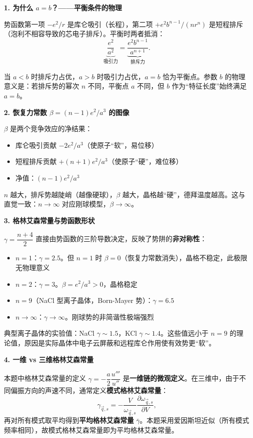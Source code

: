 \begin{insightbox}[物理图像与概念深化]
\textbf{1. 为什么 $a=b$？——平衡条件的物理}

势函数第一项 $-e^2/r$ 是库仑吸引（长程），第二项 $+e^2b^{n-1}/(nr^n)$ 是短程排斥（泡利不相容导致的芯电子排斥）。平衡时两者抵消：
\begin{equation}
\underbrace{\frac{e^2}{a^2}}_{\text{吸引力}}=\underbrace{\frac{e^2b^{n-1}}{a^{n+1}}}_{\text{排斥力}}.
\end{equation}

当 $a<b$ 时排斥力占优，$a>b$ 时吸引力占优，$a=b$ 恰为平衡点。参数 $b$ 的物理意义是：若排斥势的幂次 $n$ 不同，平衡点 $a$ 不同，但 $b$ 作为``特征长度''始终满足 $a=b$。

\textbf{2. 恢复力常数 $\beta=(n-1)e^2/a^3$ 的图像}

$\beta$ 是两个竞争效应的净结果：
\begin{itemize}
    \item 库仑吸引贡献 $-2e^2/a^3$（使原子``软''，易位移）
    \item 短程排斥贡献 $+(n+1)e^2/a^3$（使原子``硬''，难位移）
    \item 净值：$(n-1)e^2/a^3$
\end{itemize}

$n$ 越大，排斥势越陡峭（越像硬球），$\beta$ 越大，晶格越``硬''，德拜温度越高。这与直觉一致：$n\to\infty$ 对应刚球模型，$\beta\to\infty$。

\textbf{3. 格林艾森常量与势函数形状}

$\gamma=\dfrac{n+4}{2}$ 直接由势函数的三阶导数决定，反映了势阱的\textbf{非对称性}：
\begin{itemize}
    \item $n=1$：$\gamma=2.5$。但 $n=1$ 时 $\beta=0$（恢复力常数消失），晶格不稳定，此极限无物理意义
    \item $n=2$：$\gamma=3$。$\beta=e^2/a^3>0$，晶格稳定
    \item $n=9$（NaCl 型离子晶体，Born-Mayer 势）：$\gamma=6.5$
    \item $n\to\infty$：$\gamma\to\infty$。刚球势的非简谐性极端强烈
\end{itemize}

典型离子晶体的实验值：NaCl $\gamma\sim1.5$，KCl $\gamma\sim1.4$。这些值远小于 $n=9$ 的理论值，原因是实际晶体中电子云屏蔽和远程库仑作用使有效势更``软''。

\textbf{4. 一维 vs 三维格林艾森常量}

本题中格林艾森常量的定义 $\gamma=-\dfrac{a}{2}\dfrac{u'''}{u''}$ 是\textbf{一维链的微观定义}。在三维中，由于不同偏振方向的声速不同，通常定义\textbf{模式格林艾森常量}：
\begin{equation}
\gamma_{\vec q,s}=-\frac{V}{\omega_{\vec q,s}}\frac{\partial\omega_{\vec q,s}}{\partial V},
\end{equation}
再对所有模式取平均得到\textbf{平均格林艾森常量} $\bar\gamma$。本题采用爱因斯坦近似（所有模式频率相同），故模式格林艾森常量即为平均格林艾森常量。


\end{insightbox}
